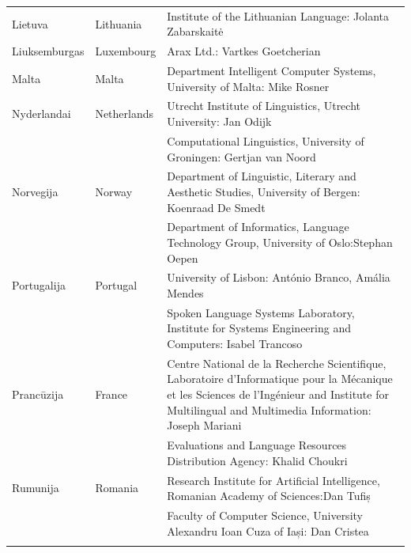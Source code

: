 \begin{longtable}{llp{113mm}}
  Lietuva & \textcolor{grey1}{Lithuania} & Institute of the Lithuanian Language: Jolanta Zabarskaitė\\ \addlinespace
  
  Liuksemburgas & \textcolor{grey1}{Luxembourg} & Arax Ltd.: Vartkes Goetcherian\\ \addlinespace
  
  Malta & \textcolor{grey1}{Malta} & Department Intelligent Computer Systems, University of Malta: Mike Rosner\\ \addlinespace
  
  Nyderlandai & \textcolor{grey1}{Netherlands} & Utrecht Institute of Linguistics, Utrecht University: Jan Odijk\\ \addlinespace 
  & & Computational Linguistics, University of Groningen: Gertjan van Noord\\ \addlinespace
  
  Norvegija & \textcolor{grey1}{Norway} & Department of Linguistic, Literary and Aesthetic Studies, University of Bergen: \newline Koenraad De Smedt\\ \addlinespace 
  & & Department of Informatics, Language Technology Group, University of Oslo:\newline Stephan Oepen \\ \addlinespace
  
  Portugalija & \textcolor{grey1}{Portugal} & University of Lisbon: António Branco, Amália Mendes \\ \addlinespace
  & & Spoken Language Systems Laboratory, Institute for Systems Engineering and Computers: Isabel Trancoso \\ \addlinespace
  
  Prancūzija & \textcolor{grey1}{France} & Centre National de la Recherche Scientifique, Laboratoire d'Informatique pour la Mécanique et les Sciences de l'Ingénieur and Institute for Multilingual and Multimedia Information: Joseph Mariani \\ \addlinespace
  & & Evaluations and Language Resources Distribution Agency: Khalid Choukri\\ \addlinespace
   
  Rumunija & \textcolor{grey1}{Romania} & Research Institute for Artificial Intelligence, Romanian Academy of Sciences:\newline Dan Tufiș \\ \addlinespace
  & & Faculty of Computer Science, University Alexandru Ioan Cuza of Iași: Dan Cristea \\ \addlinespace
  

\end{longtable}
